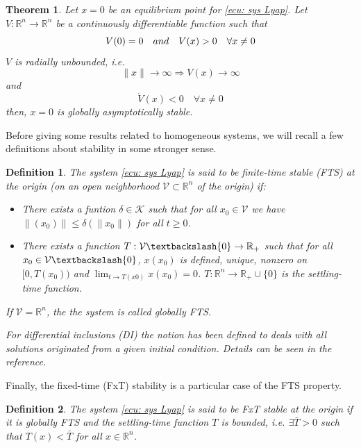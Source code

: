 \documentclass[11pt,letterpaper,twoside,openright]{report}
\newcommand{\RE}{\mathbb{R}}
\providecommand{\norm}[1]{\lVert#1\rVert}
\newtheorem{theorem}{Theorem}[chapter]
\newtheorem{definition}{Definition}[chapter]
\begin{document}
\begin{theorem}
		Let $x=0$ be an equilibrium point for \eqref{ecu: sys Lyap}. Let $V: \RE^n \rightarrow \RE^n$ be a continuously differentiable function such that
	\begin{equation}
			V(0) = 0 \quad and \quad V(x) > 0 \quad \forall x \neq 0 \\
	\end{equation}
	$V$ is radially unbounded, i.e.
	\begin{equation}
		\norm{x} \rightarrow \infty \Rightarrow V(x) \rightarrow \infty
	\end{equation}
	and
	\begin{equation}
		\dot{V}(x) < 0 \quad \forall x\neq 0
	\end{equation}
	then, $x=0$ is globally asymptotically stable.
\end{theorem} 

Before giving some results related to homogeneous systems, we will recall a few definitions about stability in some stronger sense. 

\begin{definition}
	\cite{Bhat2005} The system \eqref{ecu: sys Lyap} is said to be finite-time stable (FTS) at the origin (on an open neighborhood $\mathcal{V} \subset \RE^n$ of the origin) if:
	\begin{itemize}
		\item There exists a funtion $\delta\in \mathcal{K}$ such that for all $x_0\in \mathcal{V}$ we have $\norm{(x_0)}\leq \delta(\norm{x_0})$ for all $t\geq 0$.
		\item There exists a function $T:\mathcal{V}\textbackslash \{0 \} \rightarrow \RE_{+}$ such that for all $x_0\in \mathcal{V}\textbackslash \{0 \}$, $x(x_0)$ is defined, unique, nonzero on $[0,T(x_0))$ and $\lim_{t\rightarrow T(x0)}x(x_0) = 0$. $T:\RE^n \rightarrow \RE_{+} \cup \{0\}$ is the settling-time function.
	\end{itemize}
	If $\mathcal{V}=\RE^n$, the the system is called globally FTS.
	
	For differential inclusions (DI) the notion has been defined to deals with all solutions originated from a given initial condition. Details can be seen in the reference.
\end{definition}

Finally, the fixed-time (FxT) stability is a particular case of the FTS property.

\begin{definition}
	The system \eqref{ecu: sys Lyap} is said to be FxT stable at the origin if it is globally FTS and the settling-time function $T$ is bounded, i.e. $\exists \bar{T}>0$ such that $T(x)<\bar{T}$ for all $x\in \RE^n$.
\end{definition}
\end{document}
